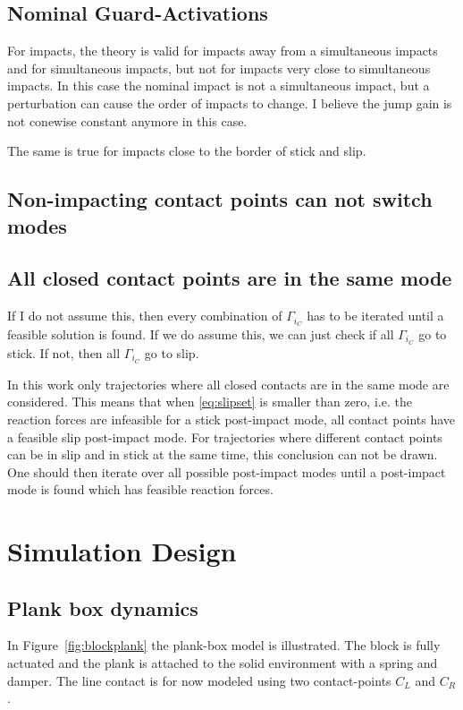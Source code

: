 \documentclass[../DC2017114Bouma.tex]{subfiles}
\begin{document}
\section{Nominal Guard-Activations}
For impacts, the theory is valid for impacts away from a simultaneous impacts and for simultaneous impacts, but not for impacts very close to simultaneous impacts. In this case the nominal impact is not a simultaneous impact, but a perturbation can cause the order of impacts to change. I believe the jump gain is not conewise constant anymore in this case.

The same is true for impacts close to the border of stick and slip.

\section{Non-impacting contact points can not switch modes}
\section{All closed contact points are in the same mode}
If I do not assume this, then every combination of $\Gamma_{i_C}$ has to be iterated until a feasible solution is found. If we do assume this, we can just check if all $\Gamma_{i_C}$ go to stick. If not, then all $\Gamma_{i_C}$ go to slip.

In this work only trajectories where all closed contacts are in the same mode are considered. This means that when \eqref{eq:slipset} is smaller than zero, i.e. the reaction forces are infeasible for a stick post-impact mode, all contact points have a feasible slip post-impact mode. For trajectories where different contact points can be in slip and in stick at the same time, this conclusion can not be drawn. One should then iterate over all possible post-impact modes until a post-impact mode is found which has feasible reaction forces.

\pagestyle{fancyreport}
\cleartooddpage
\pagestyle{fancyreport}
\chapter{Simulation Design}
\section{Plank box dynamics}
In Figure~\ref{fig:blockplank} the plank-box model is illustrated. The block is fully actuated and the plank is attached to the solid environment with a spring and damper. The line contact is for now modeled using two contact-points $C_L$ and $C_R$.
\end{document}
